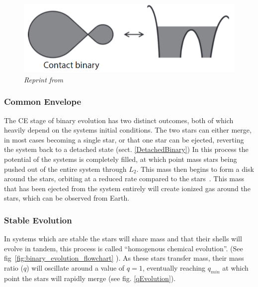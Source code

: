 \documentclass[12pt, a4paper]{article}
\begin{document}
        
        \begin{figure}
            \centering
            \includegraphics[scale = .4]{Figs/Conact Binary.png}

            \caption{\textit{Reprint from~\cite{TaurisvandenHeuvel+2023}}}
            \label{ContactBinaryRL}
        \end{figure}
        
        \subsubsection{Common Envelope}\label{CommonEnvelope}
            The CE stage of binary evolution has two distinct outcomes, both of which heavily depend on the systems initial conditions. The two stars can either merge, in most cases becoming a single star, or that one star can be ejected, reverting the system back to a detached state (sect. \ref{DetachedBinary}) In this process the potential of the systems is completely filled, at which point mass stars being pushed out of the entire system through $L_2$. This mass then begins to form a disk around the stars, orbiting at a reduced rate compared to the stars~\cite{TaurisvandenHeuvel+2023}. This mass that has been ejected from the system entirely will create ionized gas around the stars, which can be observed from Earth. ~\cite{TaurisvandenHeuvel+2023}

        \subsubsection{Stable Evolution}\label{CommonEnvelopeStableEvoluton}
            In systems which are stable the stars will share mass and that their shells will evolve in tandem, this process is called ``homogenous chemical evolution''. (See fig~\ref{fig:binary_evolution_flowchart} \cite{Chen_2024}). As these stars transfer mass, their mass ratio ($q$) will oscillate around a value of $q=1$, eventually reaching $q_{min}$ at which point the stars will rapidly merge (see fig. \ref{qEvolution}). \cite{Pešta_2023}
            
\end{document}
